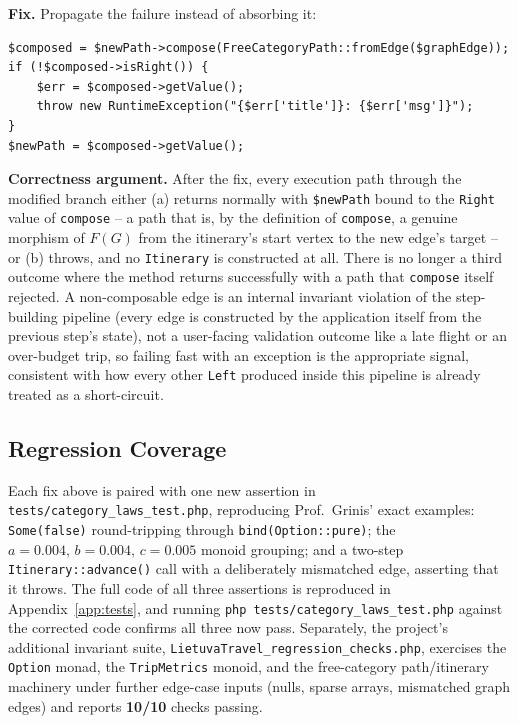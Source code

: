 \documentclass[a4paper,12pt,fleqn]{article}
\begin{document}
\textbf{Fix.} Propagate the failure instead of absorbing it:
\begin{lstlisting}[caption={Fixed \texttt{Itinerary::advance} -- Left fails the computation}]
$composed = $newPath->compose(FreeCategoryPath::fromEdge($graphEdge));
if (!$composed->isRight()) {
    $err = $composed->getValue();
    throw new RuntimeException("{$err['title']}: {$err['msg']}");
}
$newPath = $composed->getValue();
\end{lstlisting}

\textbf{Correctness argument.} After the fix, every execution path through the modified branch either (a) returns normally with \texttt{\$newPath} bound to the \texttt{Right} value of \texttt{compose} -- a path that is, by the definition of \texttt{compose}, a genuine morphism of $F(G)$ from the itinerary's start vertex to the new edge's target -- or (b) throws, and no \texttt{Itinerary} is constructed at all. There is no longer a third outcome where the method returns successfully with a path that \texttt{compose} itself rejected. A non-composable edge is an internal invariant violation of the step-building pipeline (every edge is constructed by the application itself from the previous step's state), not a user-facing validation outcome like a late flight or an over-budget trip, so failing fast with an exception is the appropriate signal, consistent with how every other \texttt{Left} produced inside this pipeline is already treated as a short-circuit.

\subsection{Regression Coverage}\label{sec:coverage}

Each fix above is paired with one new assertion in \texttt{tests/category\_laws\_test.php}, reproducing Prof.~Grinis' exact examples: \texttt{Some(false)} round-tripping through \texttt{bind(Option::pure)}; the $a=0.004,\,b=0.004,\,c=0.005$ monoid grouping; and a two-step \texttt{Itinerary::advance()} call with a deliberately mismatched edge, asserting that it throws. The full code of all three assertions is reproduced in Appendix~\ref{app:tests}, and running \texttt{php tests/category\_laws\_test.php} against the corrected code confirms all three now pass. Separately, the project's additional invariant suite, \texttt{LietuvaTravel\_regression\_checks.php}, exercises the \texttt{Option} monad, the \texttt{TripMetrics} monoid, and the free-category path/itinerary machinery under further edge-case inputs (nulls, sparse arrays, mismatched graph edges) and reports \textbf{10/10} checks passing.
\end{document}
